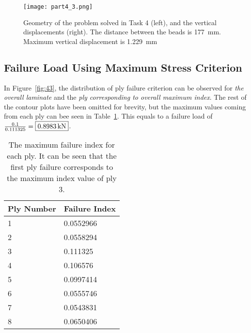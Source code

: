 \documentclass[a4paper,twosided,11pt,DIV14]{scrartcl}
\begin{document}
\begin{figure}[H]
\begin{center}
  \texttt{[image: part4\_3.png]}
\end{center}
\caption{Geometry of the problem solved in Task 4 (left), and the vertical
  displacements (right). The distance between the
  beads is \SI{177}{mm}. Maximum vertical displacement is \SI{1.229}{mm}}
\label{fig:41}
\end{figure}

\subsection{Failure Load Using Maximum Stress Criterion}

In Figure~\ref{fig:43}, the distribution of ply failure criterion can be
observed for \emph{the overall laminate} and the \emph{ply corresponding to overall
maximum index}. The rest of the contour plots have been omitted for brevity, but
the maximum values coming from each ply can bee seen in Table~\ref{tab:indices1}.
This equals to a failure load of $\frac{0.1}{0.111325} = \fbox{\SI{0.8983}{kN}}$.




\begin{table}[H]
  \centering
  \begin{tabular}{ll}
    \toprule
    Ply Number & Failure Index \\
    \midrule
    1 & 0.0552966 \\
    2 & 0.0558294 \\
    3 & 0.111325 \\
    4 & 0.106576 \\
    5 & 0.0997414 \\
    6 & 0.0555746 \\
    7 & 0.0543831 \\
    8 & 0.0650406 \\
    \bottomrule
  \end{tabular}
  \caption{The maximum failure index for each ply. It can be seen that the first
    ply failure corresponds to the maximum index value of ply 3.}
  \label{tab:indices1}
\end{table}
\end{document}
